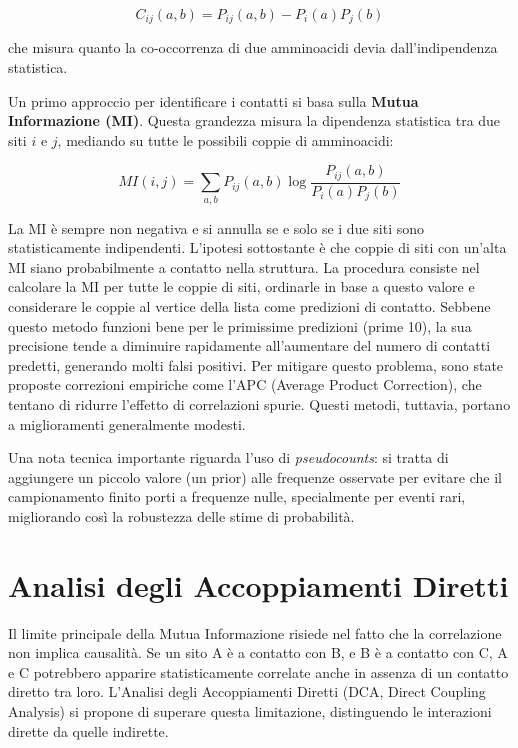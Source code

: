 \begin{equation} \label{eq:ch25_1}
C_{ij}(a,b) = P_{ij}(a,b) - P_i(a)P_j(b)
\end{equation}

che misura quanto la co-occorrenza di due amminoacidi devia dall'indipendenza statistica.

Un primo approccio per identificare i contatti si basa sulla \textbf{Mutua Informazione (MI)}. Questa grandezza misura la dipendenza statistica tra due siti $i$ e $j$, mediando su tutte le possibili coppie di amminoacidi:

\begin{equation} \label{eq:ch25_2}
MI(i,j) = \sum_{a,b} P_{ij}(a,b) \log \frac{P_{ij}(a,b)}{P_i(a)P_j(b)}
\end{equation}

La MI è sempre non negativa e si annulla se e solo se i due siti sono statisticamente indipendenti.
L'ipotesi sottostante è che coppie di siti con un'alta MI siano probabilmente a contatto nella struttura. La procedura consiste nel calcolare la MI per tutte le coppie di siti, ordinarle in base a questo valore e considerare le coppie al vertice della lista come predizioni di contatto.
Sebbene questo metodo funzioni bene per le primissime predizioni (prime 10), la sua precisione tende a diminuire rapidamente all'aumentare del numero di contatti predetti, generando molti falsi positivi.
Per mitigare questo problema, sono state proposte correzioni empiriche come l'APC (Average Product Correction), che tentano di ridurre l'effetto di correlazioni spurie. Questi metodi, tuttavia, portano a miglioramenti generalmente modesti.

Una nota tecnica importante riguarda l'uso di \textit{pseudocounts}: si tratta di aggiungere un piccolo valore (un prior) alle frequenze osservate per evitare che il campionamento finito porti a frequenze nulle, specialmente per eventi rari, migliorando così la robustezza delle stime di probabilità.


\section{Analisi degli Accoppiamenti Diretti}
Il limite principale della Mutua Informazione risiede nel fatto che la correlazione non implica causalità. Se un sito A è a contatto con B, e B è a contatto con C, A e C potrebbero apparire statisticamente correlate anche in assenza di un contatto diretto tra loro.
L'Analisi degli Accoppiamenti Diretti (DCA, Direct Coupling Analysis) si propone di superare questa limitazione, distinguendo le interazioni dirette da quelle indirette.

